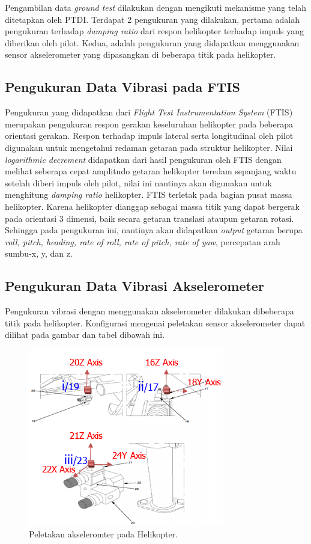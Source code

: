Pengambilan data \textit{ground test} dilakukan dengan mengikuti mekanisme yang telah ditetapkan oleh PTDI. Terdapat 2 pengukuran yang dilakukan, pertama adalah pengukuran terhadap \textit{damping ratio} dari respon helikopter terhadap impuls yang diberikan oleh pilot. Kedua, adalah pengukuran yang didapatkan menggunakan sensor akselerometer yang dipasangkan di beberapa titik pada helikopter.

\subsection{Pengukuran Data Vibrasi pada FTIS}
Pengukuran yang didapatkan dari \textit{Flight Test Instrumentation System} (FTIS) merupakan pengukuran respon gerakan keseluruhan helikopter pada beberapa orientasi gerakan. Respon terhadap impuls lateral serta longitudinal oleh pilot digunakan untuk mengetahui redaman getaran pada struktur helikopter. Nilai \textit{logarithmic decrement} didapatkan dari hasil pengukuran oleh FTIS dengan melihat seberapa cepat amplitudo getaran helikopter teredam sepanjang waktu setelah diberi impuls oleh pilot, nilai ini nantinya akan digunakan untuk menghitung \textit{damping ratio} helikopter. FTIS terletak pada bagian pusat massa helikopter. Karena helikopter dianggap sebagai massa titik yang dapat bergerak pada orientasi 3 dimensi, baik secara getaran translasi ataupun getaran rotasi. Sehingga pada pengukuran ini, nantinya akan didapatkan \textit{output} getaran berupa \textit{roll, pitch, heading, rate of roll, rate of pitch, rate of yaw}, percepatan arah sumbu-x, y, dan z.

\subsection{Pengukuran Data Vibrasi Akselerometer}
Pengukuran vibrasi dengan menggunakan akselerometer dilakukan dibeberapa titik pada helikopter. Konfigurasi mengenai peletakan sensor akselerometer dapat dilihat pada gambar dan tabel dibawah ini.

\begin{figure}[H]
	\centering
	\includegraphics[width=0.6\linewidth]{gambar/peletakan_sensor.png}
	\caption{Peletakan akseleromter pada Helikopter.}
	\label{peletakan_sensor.png}
\end{figure}


